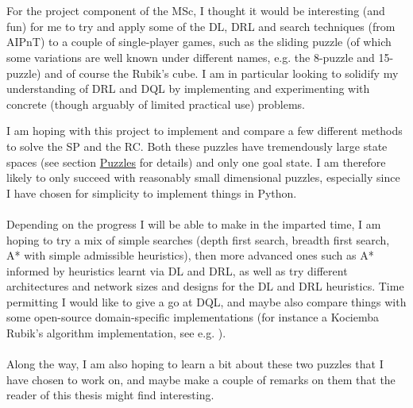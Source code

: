 \\
\\
For the project component of the MSc, I thought it would be interesting (and fun) for me to try and apply some of the DL, DRL and search techniques (from AIPnT) to a couple of single-player games, such as the sliding puzzle (of which some variations are well known under different names, e.g. the 8-puzzle and 15-puzzle) and of course the Rubik's cube. I am in particular looking to solidify my understanding of DRL and DQL by  implementing and experimenting with concrete (though arguably of limited practical use) problems.


\newpage
{}

I am hoping with this project to implement and compare a few different methods to solve the SP and the RC. Both these puzzles have tremendously large state spaces (see section \hyperref[sec:Puzzles]{Puzzles} for details) and only one goal state. I am therefore likely to only succeed with reasonably small dimensional puzzles, especially since I have chosen for simplicity to implement things in Python.
\\
\\
Depending on the progress I will be able to make in the imparted time, I am hoping to try a mix of simple searches (depth first search, breadth first search, A* with simple admissible heuristics), then more advanced ones such as A* informed by heuristics learnt via DL and DRL, as well as try different architectures and network sizes and designs for the DL and DRL heuristics. Time permitting I would like to give a go at DQL, and maybe also compare things with some open-source domain-specific implementations (for instance a Kociemba Rubik's algorithm implementation, see e.g. \cite{Kociemba}).
\\
\\
Along the way, I am also hoping to learn a bit about these two puzzles that I have chosen to work on, and maybe make a couple of remarks on them that the reader of this thesis might find interesting.
